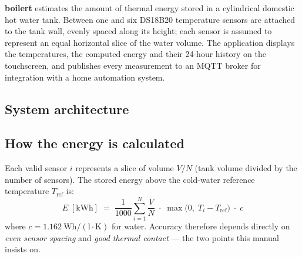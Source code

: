 \documentclass[11pt,a4paper,parskip=half]{scrartcl}
\begin{document}
\textbf{boilert} estimates the amount of thermal energy stored in a cylindrical
domestic hot water tank. Between one and six DS18B20 temperature sensors are
attached to the tank wall, evenly spaced along its height; each sensor is
assumed to represent an equal horizontal slice of the water volume. The
application displays the temperatures, the computed energy and their 24-hour
history on the touchscreen, and publishes every measurement to an MQTT broker
for integration with a home automation system.

\subsection{System architecture}

\begin{center}
\end{center}

\subsection{How the energy is calculated}

Each valid sensor $i$ represents a slice of volume $V/N$ (tank volume divided
by the number of sensors). The stored energy above the cold-water reference
temperature $T_{\mathrm{ref}}$ is:
\[
  E\;[\mathrm{kWh}] \;=\; \frac{1}{1000}\sum_{i=1}^{N}
    \frac{V}{N}\;\cdot\;
    \max\bigl(0,\;T_i - T_{\mathrm{ref}}\bigr)\;\cdot\; c
\]
where $c = 1.162~\mathrm{Wh/(l\cdot K)}$ for water. Accuracy therefore depends
directly on \emph{even sensor spacing} and \emph{good thermal contact} --- the
two points this manual insists on.
\end{document}
